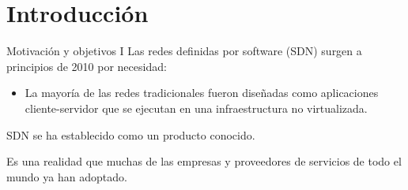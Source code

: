 \documentclass[10pt,spanish,xcolor={svgnames}]{beamer}
\newcommand*\quotesize{60} %
\newcommand*{\openquote}
   {\tikz[remember picture,overlay,xshift=-4ex,yshift=-2.5ex]
   \node (OQ) {\quotefont\fontsize{\quotesize}{\quotesize}\selectfont``};\kern0pt}
\newcommand*{\closequote}[1]
  {\tikz[remember picture,overlay,xshift=4ex,yshift={#1}]
   \node (CQ) {\quotefont\fontsize{\quotesize}{\quotesize}\selectfont''};}
\newcommand*\shadedauthorformat{\emph} %
\newcommand*\authoralign[1]{%
  \if#1l
    \def\authorfill{}\def\quotefill{\hfill}
  \else
    \if#1r
      \def\authorfill{\hfill}\def\quotefill{}
    \else
      \if#1c
        \gdef\authorfill{\hfill}\def\quotefill{\hfill}
      \else\typeout{Invalid option}
      \fi
    \fi
  \fi}
\newenvironment{shadequote}[2][l]%
{\authoralign{#1}
\ifblank{#2}
   {\def\shadequoteauthor{}\def\yshift{-2ex}\def\quotefill{\hfill}}
   {\def\shadequoteauthor{\par\authorfill\shadedauthorformat{#2}}\def\yshift{2ex}}
\begin{snugshade}\begin{quote}\openquote}
{\shadequoteauthor\quotefill\closequote{\yshift}\end{quote}\end{snugshade}}
\begin{document}
\section{Introducción}


\begin{frame}{Motivación y objetivos I}
\vspace{-2em}
Las redes definidas por software (SDN) surgen a principios de 2010 \alert{por necesidad}:
\begin{itemize}
	\item La mayoría de las redes tradicionales fueron diseñadas como aplicaciones cliente-servidor que se ejecutan en una infraestructura no virtualizada.
\end{itemize}

SDN se ha establecido como un producto conocido.

Es una realidad que muchas de las empresas y proveedores de servicios de todo el mundo ya han adoptado.


\end{frame}




\end{document}
